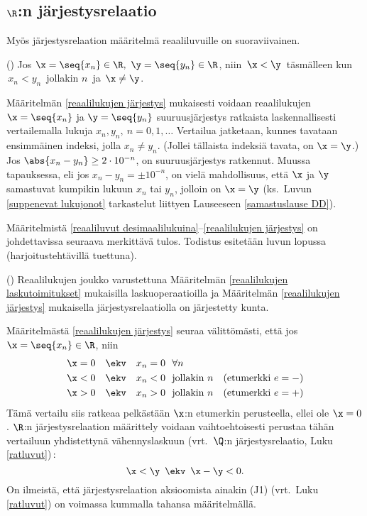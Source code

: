\subsection{$\R$:n järjestysrelaatio}

Myös järjestysrelaation määritelmä reaaliluvuille on suoraviivainen. 
\begin{Def} \label{reaalilukujen järjestys} 
() Jos $\x=\seq{x_n}\in\R,\ \y=\seq{y_n}\in\R$, niin
$\,\x<\y\,$ täsmälleen kun $\,x_n<y_n\,$ jollakin $n\,$ ja $\,\x\neq\y$.
\end{Def}
Määritelmän \ref{reaalilukujen järjestys} mukaisesti voidaan reaalilukujen
$\x=\seq{x_n}$ ja $\y=\seq{y_n}$ suuruusjärjestys ratkaista laskennallisesti vertailemalla
lukuja $x_n,y_n,\ n=0,1,\ldots$ Vertailua jatketaan, kunnes tavataan ensimmäinen indeksi, 
jolla $x_n \neq y_n$. (Jollei tällaista indeksiä tavata, on $\x=\y$.) Jos 
$\abs{x_n-y_n} \ge 2 \cdot 10^{-n}$, on suuruusjärjestys ratkennut. Muussa tapauksessa,
eli jos $x_n-y_n = \pm 10^{-n}$, on vielä mahdollisuus, että $\x$ ja $\y$ samastuvat
kumpikin lukuun $x_n$ tai $y_n$, jolloin on $\x=\y$ (ks.\ Luvun \ref{suppenevat lukujonot}
tarkastelut liittyen Lauseeseen \ref{samastuslause DD}).

Määritelmistä \ref{reaaliluvut desimaalilukuina}--\ref{reaalilukujen järjestys} on
johdettavissa seuraava merkittävä tulos. Todistus esitetään luvun lopussa
(harjoitustehtävillä tuettuna).
\begin{*Lause} \label{R on kunta} ()
Reaalilukujen joukko varustettuna Määritelmän \ref{reaalilukujen laskutoimitukset}
mukaisilla laskuoperaatioilla ja Määritelmän \ref{reaalilukujen järjestys} mukaisella
järjestysrelaatiolla on järjestetty kunta. 
\end{*Lause}

Määritelmästä \ref{reaalilukujen järjestys} seuraa välittömästi, että jos
$\x = \seq{x_n} \in \R$, niin
\begin{align*}
\x = 0 \quad &\ekv \quad x_n = 0\ \ \forall n \\
\x < 0 \quad &\ekv \quad x_n < 0\ \ \text{jollakin}\ n \quad (\text{etumerkki}\ e = - ) \\
\x > 0 \quad &\ekv \quad x_n > 0\ \ \text{jollakin}\ n \quad (\text{etumerkki}\ e = + )
\end{align*}
Tämä vertailu siis ratkeaa pelkästään $\x$:n etumerkin perusteella, ellei ole $\x=0$. $\R$:n
järjestysrelaation määrittely voidaan vaihtoehtoisesti perustaa tähän vertailuun yhdistettynä
vähennyslaskuun (vrt.\ $\Q$:n järjestysrelaatio, Luku \ref{ratluvut})\,:
\[
\x<\y \,\ \ekv \,\ \x-\y<0.
\]
On ilmeistä, että järjestysrelaation aksioomista ainakin (J1) (vrt.\ Luku \ref{ratluvut})
on voimassa kummalla tahansa määritelmällä. 

